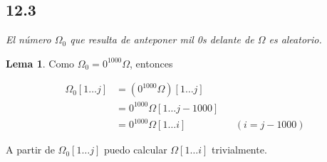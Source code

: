 \documentclass{article}
\theoremstyle{definition} %
\newtheorem{lemma}{Lema}
\newcommand{\first}[2]{#2[1 \dots #1]}
\begin{document}
\subsection*{12.3}

\textit{El número $\Omega_0$ que resulta de anteponer mil 0s delante de $\Omega$ es aleatorio.}

\begin{lemma}\label{lemma:12.3}
    Como $\Omega_0 = 0^{1000} \Omega$, entonces 
    
    \begin{align*}
        \first{j}{\Omega_0}
        &= \first{j}{(0^{1000} \Omega)} \\
        &= 0^{1000} \first{j - 1000}{\Omega} \\
        &= 0^{1000} \first{i}{\Omega} && (i = j - 1000)
    \end{align*}

    A partir de $\first{j}{\Omega_0}$ puedo calcular $\first{i}{\Omega}$
    trivialmente.
\end{lemma}
\end{document}
